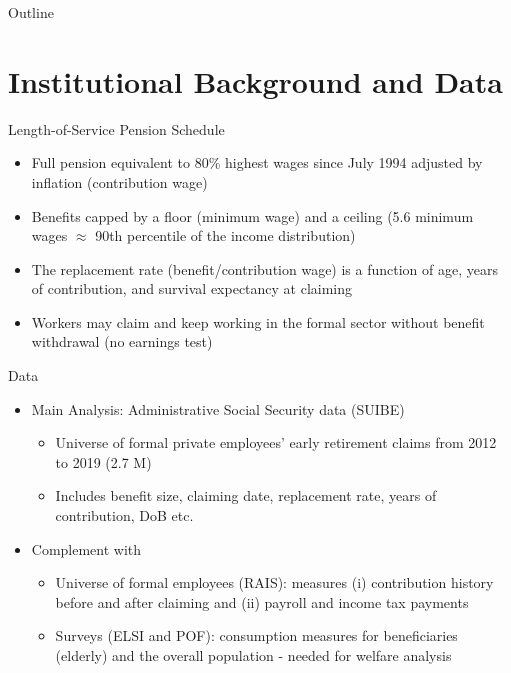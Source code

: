\begin{frame}{Outline}
  \tableofcontents
\end{frame}

\section{Institutional Background and Data}


\begin{frame}[label=lengthService]{Length-of-Service Pension Schedule}
    \begin{itemize}
        \item Full pension equivalent to 80\% highest wages since July 1994 adjusted by inflation (contribution wage)
        \item Benefits capped by a floor (minimum wage) and a ceiling (5.6 minimum wages $\approx$ 90th percentile of the income distribution)
        \item The replacement rate (benefit/contribution wage) is a function of age, years of contribution, and survival expectancy at claiming
        \item Workers may claim and keep working in the formal sector without benefit withdrawal (no earnings test)
    \end{itemize}
\end{frame}

\begin{frame}{Data}
    \begin{itemize}
        \item Main Analysis: Administrative Social Security data (SUIBE)
        \begin{itemize}
            \item Universe of formal private employees' early retirement claims from 2012 to 2019 (2.7 M)
            \item Includes benefit size, claiming date, replacement rate, years of contribution, DoB etc.
        \end{itemize}
        \item Complement with
        \begin{itemize}
            \item Universe of formal employees (RAIS):  measures (i) contribution history before and after claiming and (ii) payroll and income tax payments
            \item Surveys (ELSI and POF): consumption measures for beneficiaries (elderly) and the overall population - needed for welfare analysis
        \end{itemize}
    \end{itemize}
\end{frame}

